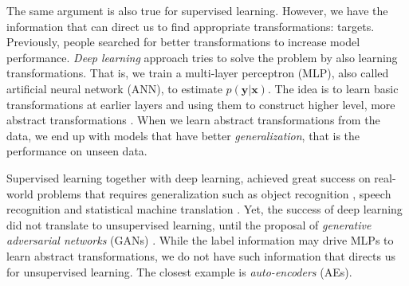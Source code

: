 \documentclass[a4paper,onesided,12pt]{report}
\begin{document}
The same argument is also true for supervised learning. However, we have the information that can direct us to find appropriate transformations: targets. Previously, people searched for better transformations to increase model performance. \emph{Deep learning} approach tries to solve the problem by also learning transformations. That is, we train a multi-layer perceptron (MLP), also called artificial neural network (ANN), to estimate $p(\boldsymbol{y}|\boldsymbol{x})$. The idea is to learn basic transformations at earlier layers and using them to construct higher level, more abstract transformations \cite{bengio2009}. When we learn abstract transformations from the data, we end up with models that have better \emph{generalization}, that is the performance on unseen data.

Supervised learning together with deep learning, achieved great success on real-world problems that requires generalization such as object recognition \cite{alexnet}, speech recognition \cite{acoustic} and statistical machine translation \cite{seq2seq}. Yet, the success of deep learning did not translate to unsupervised learning, until the proposal of \emph{generative adversarial networks} (GANs) \cite{gan}. While the label information may drive MLPs to learn abstract transformations, we do not have such information that directs us for unsupervised learning. The closest example is \emph{auto-encoders} (AEs).


\end{document}
